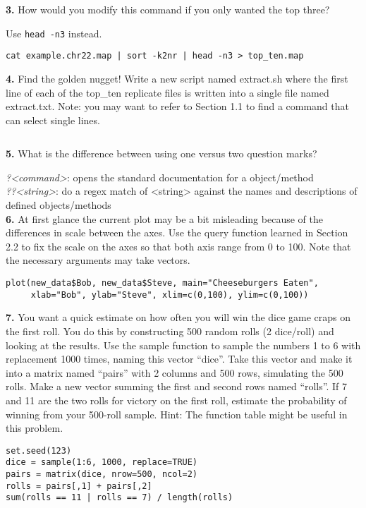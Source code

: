 \documentclass{essay}
\begin{document}
\begin{essaystyle}
\textbf{3.} How would you modify this command if you only wanted the top three?

Use \texttt{head -n3} instead.

\begin{verbatim}
cat example.chr22.map | sort -k2nr | head -n3 > top_ten.map
\end{verbatim}


\textbf{4.} Find the golden nugget! Write a new script named extract.sh where the first
line of each of the top\_ten replicate files is written into a single file named
extract.txt. Note: you may want to refer to Section 1.1 to find a command that
can select single lines.

\inputminted[linenos,numbersep=.5em]{bash}{extract.sh}


\textbf{5.} What is the difference between using one versus two question marks?

\textit{?<command>}: opens the standard documentation for a object/method \\
\textit{??<string>}: do a regex match of <string> against the names and
descriptions of defined objects/methods \\


\textbf{6.} At first glance the current plot may be a bit misleading because of the
differences in scale between the axes. Use the query function learned in
Section 2.2 to fix the scale on the axes so that both axis range from 0 to 100.
Note that the necessary arguments may take vectors.

\begin{verbatim}
plot(new_data$Bob, new_data$Steve, main="Cheeseburgers Eaten",
     xlab="Bob", ylab="Steve", xlim=c(0,100), ylim=c(0,100))
\end{verbatim}


\textbf{7.} You want a quick estimate on how often you will win the dice game craps on
the first roll. You do this by constructing 500 random rolls (2 dice/roll) and
looking at the results. Use the sample function to sample the numbers 1 to 6
with replacement 1000 times, naming this vector ``dice''. Take this vector and
make it into a matrix named ``pairs'' with 2 columns and 500 rows, simulating the
500 rolls. Make a new vector summing the first and second rows named ``rolls''.
If 7 and 11 are the two rolls for victory on the first roll, estimate the
probability of winning from your 500-roll sample. Hint: The function table
might be useful in this problem.

\begin{verbatim}
set.seed(123)
dice = sample(1:6, 1000, replace=TRUE)
pairs = matrix(dice, nrow=500, ncol=2)
rolls = pairs[,1] + pairs[,2]
sum(rolls == 11 | rolls == 7) / length(rolls)


\end{verbatim}
\end{essaystyle}
\end{document}
